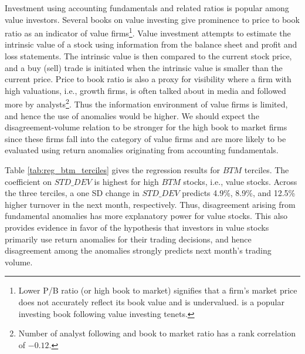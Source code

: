 \documentclass[
  11pt,
  a4paper,
  twoside,
  onecolumn]{article}
\begin{document}
Investment using accounting fundamentals and related ratios is popular
among value investors. Several books on value investing give prominence
to price to book ratio as an indicator of value firms\footnote{Lower P/B
  ratio (or high book to market) signifies that a firm's market price
  does not accurately reflect its book value and is undervalued.
  \cite{graham1965} is a popular investing book following value
  investing tenets.}. Value investment attempts to estimate the
intrinsic value of a stock using information from the balance sheet and
profit and loss statements. The intrinsic value is then compared to the
current stock price, and a buy (sell) trade is initiated when the
intrinsic value is smaller than the current price. Price to book ratio
is also a proxy for visibility where a firm with high valuations, i.e.,
growth firms, is often talked about in media and followed more by
analysts\footnote{Number of analyst following and book to market ratio
  has a rank correlation of \(-0.12\).}. Thus the information
environment of value firms is limited, and hence the use of anomalies
would be higher. We should expect the disagreement-volume relation to be
stronger for the high book to market firms since these firms fall into
the category of value firms and are more likely to be evaluated using
return anomalies originating from accounting fundamentals.

Table \ref{tab:reg_btm_terciles} gives the regression results for
\(BTM\) terciles. The coefficient on \(STD\_DEV\) is highest for high
\(BTM\) stocks, i.e., value stocks. Across the three terciles, a one SD
change in \(STD\_DEV\) predicts 4.9\%, 8.9\%, and 12.5\% higher turnover
in the next month, respectively. Thus, disagreement arising from
fundamental anomalies has more explanatory power for value stocks. This
also provides evidence in favor of the hypothesis that investors in
value stocks primarily use return anomalies for their trading decisions,
and hence disagreement among the anomalies strongly predicts next
month's trading volume.
\end{document}

